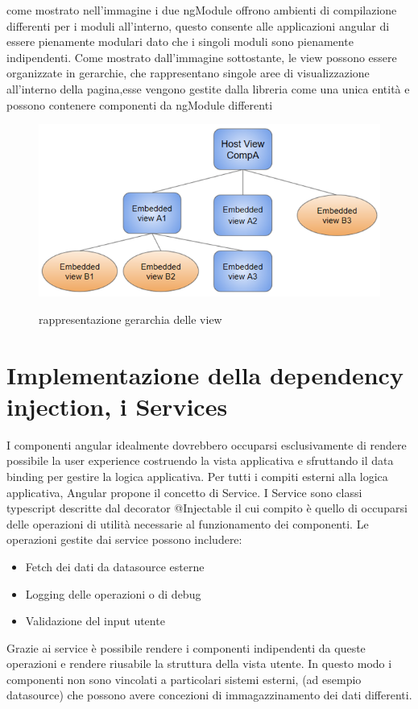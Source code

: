 come mostrato nell'immagine i due ngModule offrono ambienti di compilazione differenti per i moduli all'interno, questo consente alle applicazioni angular di essere pienamente modulari dato che i singoli moduli sono pienamente indipendenti.
\newline
Come mostrato dall'immagine sottostante, le view possono essere organizzate in gerarchie, che rappresentano singole aree di visualizzazione all'interno della pagina,esse vengono gestite dalla libreria come una unica entità e possono contenere componenti da ngModule differenti
\begin{figure}[H]
    \centering
\includegraphics[scale=1]{resources/view-hierarchy.png}
   \cite{angular-doc}
    \caption{rappresentazione gerarchia delle view}
\end{figure}
\newpage
\section{ Implementazione della dependency injection, i Services}
I componenti angular idealmente dovrebbero occuparsi esclusivamente di rendere possibile la user experience costruendo la vista applicativa e sfruttando il data binding per gestire la logica applicativa.
\newline
Per tutti i compiti esterni alla logica applicativa, Angular propone il concetto di Service.
\newline
I Service sono classi typescript descritte dal decorator @Injectable il cui compito è quello di occuparsi delle operazioni di utilità necessarie al funzionamento dei componenti.
Le operazioni gestite dai service possono includere:
\begin{itemize}
    \item Fetch dei dati da datasource esterne
    \item Logging delle operazioni o di debug
    \item Validazione del input utente
\end{itemize}
Grazie ai service è possibile rendere i componenti indipendenti da queste operazioni e rendere riusabile la struttura della vista utente.
In questo modo i componenti non sono vincolati a particolari sistemi esterni, (ad esempio datasource) che possono avere concezioni di immagazzinamento dei dati differenti.

